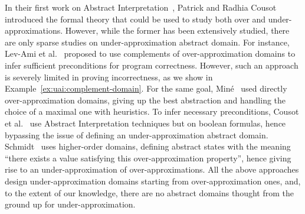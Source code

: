 In their first work on Abstract Interpretation~\cite{CC77}, Patrick and Radhia Cousot introduced the formal theory that could be used to study both over and under-approximations.
However, while the former has been extensively studied, there are only sparse studies on under-approximation abstract domain.
For instance, Lev-Ami et al.~\cite{LSRG07} proposed to use complements of over-approximation domains to infer sufficient preconditions for program correctness. However, such an approach is severely limited in proving incorrectness, as we show in Example~\ref{ex:uai:complement-domain}.
For the same goal, Miné~\cite{Mine14} used directly over-approximation domains, giving up the best abstraction and handling the choice of a maximal one with heuristics.
To infer necessary preconditions, Cousot et al.~\cite{CCL11,CCFL13} use Abstract Interpretation techniques but on boolean formulas, hence bypassing the issue of defining an under-approximation abstract domain.
Schmidt~\cite{Schmidt07} uses higher-order domains, defining abstract states with the meaning ``there exists a value satisfying this over-approximation property'', hence giving rise to an under-approximation of over-approximations.
All the above approaches design under-approximation domains starting from over-approximation ones, and, to the extent of our knowledge, there are no abstract domains thought from the ground up for under-approximation.


